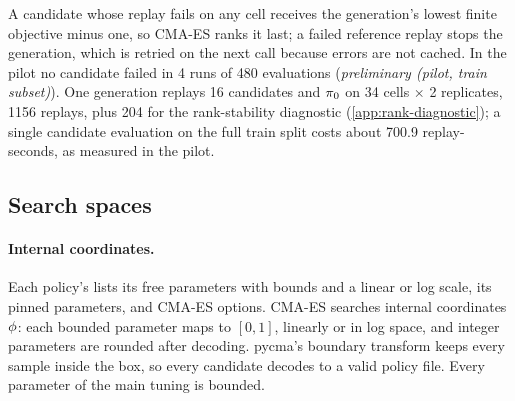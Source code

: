 A candidate whose replay fails on any cell receives the generation's lowest finite objective minus
one, so CMA-ES ranks it last; a failed reference replay stops the generation, which is retried on
the next call because errors are not cached. In the pilot no candidate failed in 4 runs of 480
evaluations (\emph{preliminary (pilot, train subset)}).
One generation replays 16 candidates and $\pi_{0}$ on 34 cells $\times$ 2 replicates, \num{1156}
replays, plus 204 for the rank-stability diagnostic (\cref{app:rank-diagnostic}); a single
candidate evaluation on the full train split costs about 700.9 replay-seconds, as measured in the
pilot.

\subsection{Search spaces}
\label{app:spaces}

\paragraph{Internal coordinates.}
Each policy's  lists its free parameters with bounds and a linear or log scale,
its pinned parameters, and CMA-ES options. CMA-ES searches internal coordinates $\phi$: each
bounded parameter maps to $[0,1]$, linearly or in log space, and integer parameters are rounded
after decoding. pycma's boundary transform keeps every sample inside the box, so every candidate
decodes to a valid policy file. Every parameter of the main tuning is bounded.


